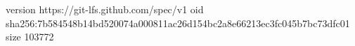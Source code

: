 version https://git-lfs.github.com/spec/v1
oid sha256:7b584548b14bd520074a000811ac26d154bc2a8e66213ec3fc045b7bc73dfc01
size 103772
